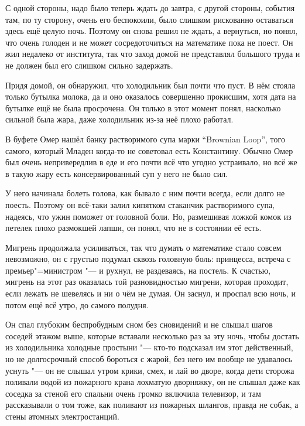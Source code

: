 С одной стороны, надо было теперь ждать до завтра, с другой стороны, события
там, по ту сторону, очень его беспокоили, было слишком рискованно оставаться
здесь ещё целую ночь.
Поэтому он снова решил не ждать, а вернуться, но понял, что очень голоден и не
может сосредоточиться на математике пока не поест.
Он жил недалеко от института, так что заход домой не представлял большого труда
и не должен был его слишком сильно задержать.

Придя домой, он обнаружил, что холодильник был почти что пуст.
В нём стояла только бутылка молока, да и оно оказалось совершенно прокисшим,
хотя дата на бутылке ещё не была просрочена.
Он только в этот момент понял, насколько сильной была жара, даже холодильник
из-за неё плохо работал.

В буфете Омер нашёл банку растворимого супа марки
\enquote{\foreignlanguage{english}{Brownian Loop}},
того самого, который Младен когда-то не советовал есть Константину.
Обычно Омер был очень непривередлив в еде и его почти всё что угодно устраивало,
но всё же в такую жару есть консервированный суп у него не было сил.

У него начинала болеть голова, как бывало с ним почти всегда, если долго не
поесть.
Поэтому он всё-таки залил кипятком стаканчик растворимого супа, надеясь, что
ужин поможет от головной боли.
Но, размешивая ложкой комок из петелек плохо размокшей лапши, он понял, что не в
состоянии её есть.

Мигрень продолжала усиливаться, так что думать о математике стало совсем
невозможно, он с грустью подумал сквозь головную боль: принцесса, встреча с
премьер"=министром "--- и рухнул, не раздеваясь, на постель.
К счастью, мигрень на этот раз оказалась той разновидностью мигрени, которая
проходит, если лежать не шевелясь и ни о чём не думая.
Он заснул, и проспал всю ночь, и потом ещё всё утро, до самого полудня.

Он спал глубоким беспробудным сном без сновидений и не слышал шагов соседей
этажом выше, которые вставали несколько раз за эту ночь, чтобы достать из
холодильника холодные простыни "--- кто-то подсказал им этот действенный, но
не долгосрочный способ бороться с жарой, без него им вообще не удавалось уснуть
"--- он не слышал утром крики, смех, и лай во дворе, когда дети сторожа поливали
водой из пожарного крана лохматую дворняжку, он не слышал даже как соседка за
стеной его спальни очень громко включила телевизор, и там рассказывали о том
тоже, как поливают из пожарных шлангов, правда не собак, а стены атомных
электростанций.

